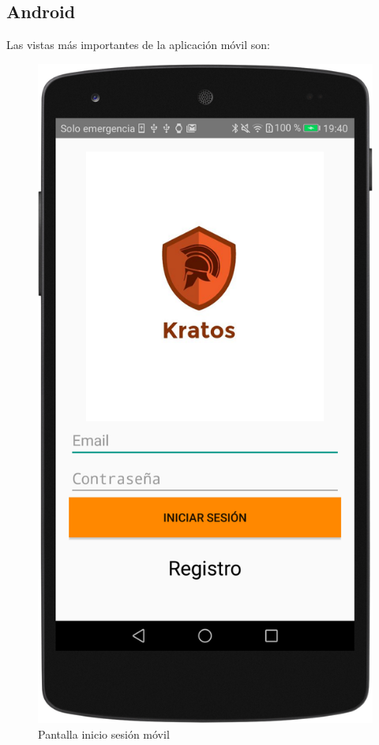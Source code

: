 \subsection*{Android}

Las vistas más importantes de la aplicación móvil son:

\begin{figure}[H]
	\centering
	\includegraphics[scale=0.10]{imagenes/m1.png}
	\caption{Pantalla inicio sesión móvil}
	\label{Pantalla inicio sesión móvil}
\end{figure}


